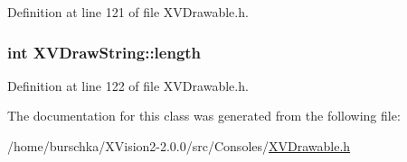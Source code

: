 Definition at line 121 of file XVDrawable.h.\label{XVDrawString_m2}
\hypertarget{class_XVDrawString_m2}{
\subsubsection[length]{\setlength{\rightskip}{0pt plus 5cm}int XVDraw\-String::length}}




Definition at line 122 of file XVDrawable.h.

The documentation for this class was generated from the following file:\begin{CompactItemize}
\item 
/home/burschka/XVision2-2.0.0/src/Consoles/\hyperlink{XVDrawable.h-source}{XVDrawable.h}\end{CompactItemize}
